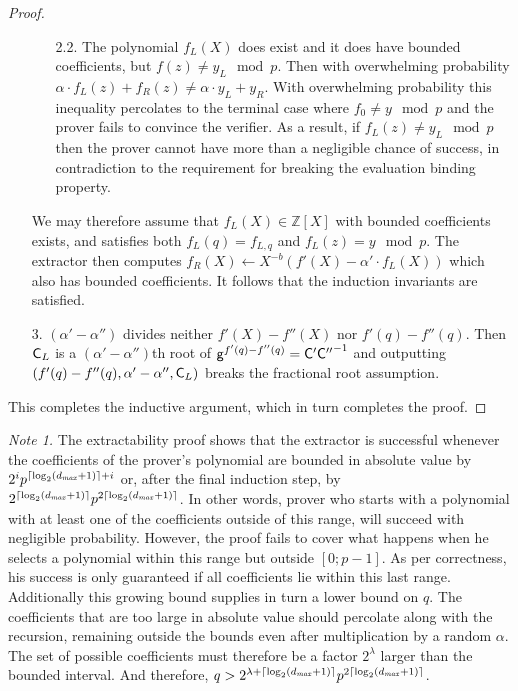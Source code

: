 \documentclass{article}
\theoremstyle{definition}
\begin{document}
\begin{proof}
\begin{itemize}
\begin{itemize}
        \item[2.2.] The polynomial $f_L(X)$ does exist and it does have bounded coefficients, but $f(z) \neq y_L \mod p$. Then with overwhelming probability $\alpha \cdot f_L(z) + f_R(z) \neq \alpha \cdot y_L + y_R$. With overwhelming probability this inequality percolates to the terminal case where $f_0 \neq y \mod p$ and the prover fails to convince the verifier. As a result, if $f_L(z) \neq y_L \mod p$ then the prover cannot have more than a negligible chance of success, in contradiction to the requirement for breaking the evaluation binding property.
    \end{itemize}
    \item[] We may therefore assume that $f_L(X) \in \mathbb{Z}[X]$ with bounded coefficients exists, and satisfies both $f_L(q) = f_{L,q}$ and $f_L(z) = y \mod p$. The extractor then computes $f_R(X) \leftarrow X^{-b}(f'(X) - \alpha' \cdot f_L(X))$ which also has bounded coefficients. It follows that the induction invariants are satisfied.
    \item[3.] $(\alpha' - \alpha'')$ divides neither $f'(X) - f''(X)$ nor $f'(q) - f''(q)$. Then $\mathsf{C}_L$ is a $(\alpha' - \alpha'')$th root of $\mathsf{g}^{f'(q) - f''(q)} = \mathsf{C}'{\mathsf{C}''}^{-1}$ and outputting $(f'(q) - f''(q), \alpha'-\alpha'', \mathsf{C}_L)$ breaks the fractional root assumption.
\end{itemize}
This completes the inductive argument, which in turn completes the proof.
\end{proof}

{\it Note 1.} The extractability proof shows that the extractor is successful whenever the coefficients of the prover's polynomial are bounded in absolute value by $2^ip^{\lceil \log_2(d_{\it max} + 1) \rceil+i}$ or, after the final induction step, by $2^{\lceil \log_2(d_{\it max} + 1) \rceil}p^{2\lceil \log_2(d_{\it max} + 1) \rceil}$. In other words, prover who starts with a polynomial with at least one of the coefficients outside of this range, will succeed with negligible probability. However, the proof fails to cover what happens when he selects a polynomial within this range but outside $[0;p-1]$. As per correctness, his success is only guaranteed if all coefficients lie within this last range. Additionally this growing bound supplies in turn a lower bound on $q$. The coefficients that are too large in absolute value should percolate along with the recursion, remaining outside the bounds even after multiplication by a random $\alpha$. The set of possible coefficients must therefore be a factor $2^\lambda$ larger than the bounded interval. And therefore, $q > 2^{\lambda + \lceil \log_2(d_{\it max} + 1) \rceil}p^{2\lceil \log_2(d_{\it max} + 1) \rceil}$.
\end{document}
